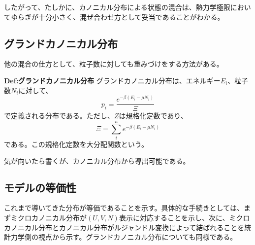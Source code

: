 \documentclass[a4paper,11pt]{jsarticle}
\numberwithin{equation}{section}
\begin{document}
したがって、たしかに、カノニカル分布による状態の混合は、熱力学極限においてゆらぎが十分小さく、混ぜ合わせ方として妥当であることがわかる。\\

\subsection{グランドカノニカル分布}
他の混合の仕方として、粒子数に対しても重みづけをする方法がある。\\
\begin{itembox}[l]{\textbf{Def:グランドカノニカル分布}}
  グランドカノニカル分布は、エネルギー$E_i$、粒子数$N_i$に対して、
  \begin{equation}
    p_i = \frac{e^{-\beta( E_i - \mu N_i)}}{\Xi}
  \end{equation}
  で定義される分布である。ただし、$Z$は規格化定数であり、
  \begin{equation}
    \Xi = \sum_{i}^{n} e^{-\beta( E_i - \mu N_i)}
  \end{equation}
  である。この規格化定数を大分配関数という。

\end{itembox}
気が向いたら書くが、カノニカル分布から導出可能である。\\

\subsection{モデルの等価性}
これまで導いてきた分布が等価であることを示す。具体的な手続きとしては、まずミクロカノニカル分布が$(U,V,N)$表示に対応することを示し、次に、ミクロカノニカル分布とカノニカル分布がルジャンドル変換によって結ばれることを統計力学側の視点から示す。グランドカノニカル分布についても同様である。\\
\end{document}
